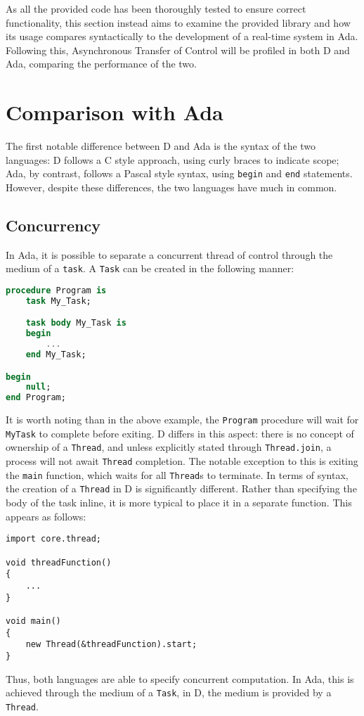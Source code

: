 
As all the provided code has been thoroughly tested to ensure correct
functionality, this section instead aims to examine the provided library and how its usage
compares syntactically to the development of a real-time system in Ada. 
Following this, Asynchronous Transfer of Control will be profiled in both D and
Ada, comparing the performance of the two. 

\section{Comparison with Ada}
The first notable difference between D and Ada is the syntax of the two languages: 
D follows a C style approach, using curly braces to indicate scope;
Ada, by contrast, follows a Pascal style syntax, using \texttt{begin} and
\texttt{end} statements. However, despite these differences,
the two languages have much in common. 

\subsection{Concurrency}
In Ada, it is possible to separate a concurrent thread of control through the
medium of a \texttt{task}. A \texttt{Task} can be created in the following manner: 
\begin{lstlisting}[basicstyle=\small,language=Ada]
procedure Program is 
    task My_Task; 

    task body My_Task is 
    begin
        ...
    end My_Task;

begin
    null; 
end Program;
\end{lstlisting}
It is worth noting than in the above example, the \texttt{Program} procedure will wait
for \texttt{My\textunderscore{}Task} to complete before exiting. D differs in this aspect: 
there is no concept of ownership of a \texttt{Thread}, and unless
explicitly stated through \texttt{Thread.join}, a process will not await
\texttt{Thread} completion. The notable exception to this is exiting the
\texttt{main} function, which waits for all \texttt{Thread}s to terminate. 
In terms of syntax, the creation of a
\texttt{Thread} in D is significantly different. Rather than specifying the body of
the task inline, it is more typical to place it in a separate function. This
appears as follows: 
\begin{lstlisting}[basicstyle=\small]
import core.thread; 

void threadFunction()
{
    ...
}

void main()
{
    new Thread(&threadFunction).start;
}
\end{lstlisting}
Thus, both languages are able to specify concurrent computation. In
Ada, this is achieved through the medium of a \texttt{Task}, in D, the medium
is provided by a \texttt{Thread}. 

